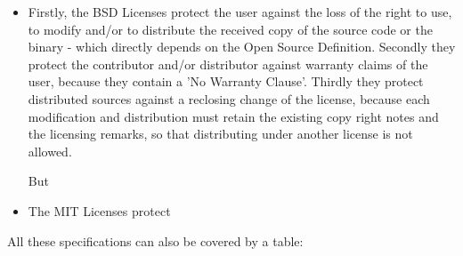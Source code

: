 \begin{itemize}
  \item Firstly, the BSD Licenses protect the user against the loss of the right
  to use, to modify and/or to distribute the received copy of the source code or
  the binary - which directly depends on the Open Source Definition.
  Secondly they protect the contributor and/or distributor against warranty
  claims of the user, because they contain a 'No Warranty Clause'. Thirdly they
  protect distributed sources against a reclosing change of the
  license, because each modification and distribution must retain the existing
  copy right notes and the licensing remarks, so that distributing under another
  license is not allowed.
  
  But
  \item The MIT Licenses protect
\end{itemize}


All these specifications can also be covered by a table:

